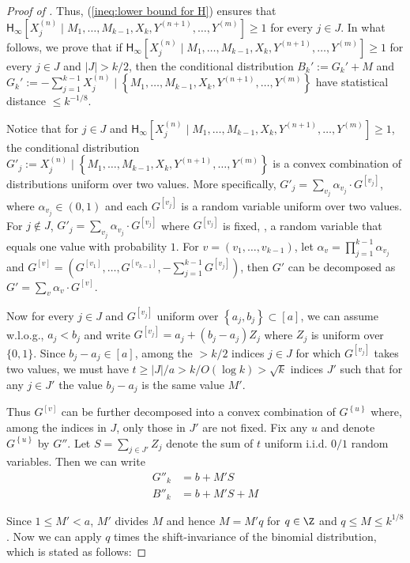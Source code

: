 \documentclass{toc}
\newcommand{\set}[1]{{\left \{{#1} \right \}}}
\newcommand{\cond}{\;|\;}
\newcommand{\Cond}{\;\Big|\;}
\newcommand{\zo}{\ensuremath{ \{ 0, 1 \} }}
\newcommand{\bigo}[1]{\ensuremath{{{O} \left( {#1} \right)}}}
\newcommand{\eqdef}{\ensuremath{:=}}
\newcommand{\Hmin}{\ensuremath{\mathsf{H}_{\infty}}}
\begin{document}
\begin{proof}[Proof of ]
		Thus, (\ref{ineq:lower bound for H}) ensures that $\Hmin\left[X^{(n)}_{j} \cond M_1,\ldots, M_{k-1}, X_k, Y^{(n+1)},\ldots, Y^{(m)} \right]\ge 1$ for every $j\in J$.
%
		In what follows, we prove that if $\Hmin\left[X^{(n)}_{j} \cond M_1,\ldots, M_{k-1}, X_k, Y^{(n+1)},\ldots, Y^{(m)} \right]\ge 1$ for every $j\in J$ and $|J|>k/2$, 
		then the conditional distribution
		$B_k'\eqdef G_k'+M$  and
		$G_k'\eqdef -\sum_{j=1}^{k-1}X^{(n)}_{j} \Cond \set{M_1,\ldots, M_{k-1}, X_k, Y^{(n+1)},\ldots, Y^{(m)}}$ have statistical distance $\le k^{-1/8}$.

		Notice that for $j\in J$ and $\Hmin\left[X^{(n)}_{j} \cond M_1,\ldots, M_{k-1}, X_k, Y^{(n+1)},\ldots, Y^{(m)} \right]\ge 1$,
		the conditional distribution 
		$G'_j\eqdef X^{(n)}_{j} \Cond \set{M_1,\ldots, M_{k-1}, X_k, Y^{(n+1)},\ldots, Y^{(m)}}$ is a convex combination of distributions uniform over two values.
		More specifically, $G'_j=\sum_{v_j} \alpha_{v_j}\cdot G^{[v_j]}$, where $\alpha_{v_j}\in (0,1)$  and each $G^{[v_j]}$ is a random variable uniform over two values. %
		For $j\notin J$, $G'_j=\sum_{v_j} \alpha_{v_j} \cdot G^{[v_j]} $ where $G^{[v_j]}$ is fixed, \ie, a random variable that equals one value with probability $1$.
		For $v=(v_1,\dots,v_{k-1})$, let $\alpha_v=\prod_{j=1}^{k-1}\alpha_{v_j}$ and $G^{[v]}=\left(G^{[v_1]},\ldots,G^{[v_{k-1}]}, -\sum_{j=1}^{k-1} G^{[v_j]}\right)$,
		then $G'$ can be decomposed as
		$G'=\sum_{v} \alpha_v\cdot G^{[v]}$. 


		Now for every $j\in J$ and $G^{[v_j]}$ uniform over $\set{a_j,b_j}\subset [a]$,
		we can assume w.l.o.g., $a_j<b_j$ and write $G^{[v_j]}=a_j + (b_j-a_j) Z_j$ where $Z_j$ is uniform over $\zo$.
		Since $b_j-a_j\in [a]$, among the $>k/2$ indices $j\in J$ for which $G^{[v_j]}$ takes two values, 
		we must have $t\ge |J|/a>k/\bigo{\log k}>\sqrt{k}$ indices $J'$ such that for any $j\in J'$ the value $b_j-a_j$ is the same value $M'$.

		Thus $G^{[v]}$ can be further decomposed into a convex combination of $G^\set{u}$ where, among the indices in $J$, only those in $J'$ are not fixed.
		Fix any $u$ and denote $G^\set{u}$ by $G''$.
		Let $S=\sum_{j\in J'} Z_j$ denote the sum of $t$ uniform i.i.d. $0/1$ random variables.
		Then we can write
		\begin{align*}
			G''_k &= b + M' S\\
			B''_k &= b + M' S + M
		\end{align*}

		Since $1\le M'<a$, $M'$ divides $M$ and hence $M=M'q$ for $q\in \Z$ and $q\le M\le k^{1/8}$.
%
		Now we can apply $q$ times the shift-invariance of the binomial distribution, which is stated as follows:


\end{proof}
\end{document}

